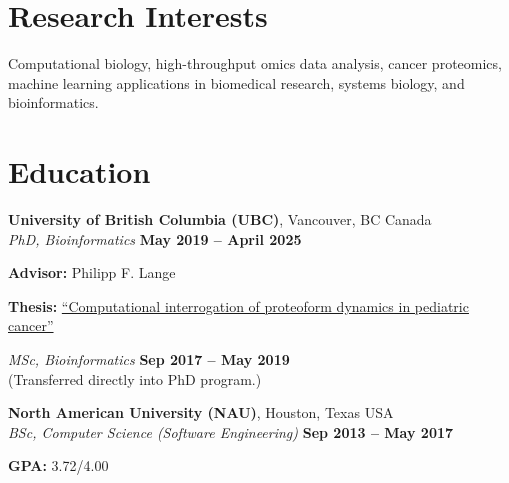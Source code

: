 \documentclass[margin,line]{res}
\begin{document}
\begin{resume}
\section{\sc Research Interests}
Computational biology, high-throughput omics data analysis, cancer proteomics, machine learning applications in biomedical research, systems biology, and bioinformatics.


\section{\sc Education}

{\bf University of British Columbia (UBC)}, Vancouver, BC Canada\\
{\em PhD, Bioinformatics} \hfill {\bf May 2019 -- April 2025}\\
\vspace*{.05in}
\begin{list2}
\item {\bf Advisor:} Philipp F. Lange
\item {\bf Thesis:} \href{https://open.library.ubc.ca/cIRcle/collections/ubctheses/24/items/1.0448334}{``Computational interrogation of proteoform dynamics in pediatric cancer''}
\end{list2}
\vspace*{4pt}
{\em MSc, Bioinformatics} \hfill {\bf Sep 2017 -- May 2019}\\
{\small (Transferred directly into PhD program.)}

\vspace*{8pt}
{\bf North American University (NAU)}, Houston, Texas USA\\
{\em BSc, Computer Science (Software Engineering)} \hfill {\bf Sep 2013 -- May 2017}\\
\vspace*{.05in}
\begin{list2}
\item {\bf GPA:} 3.72/4.00
\end{list2}



\end{resume}
\end{document}
